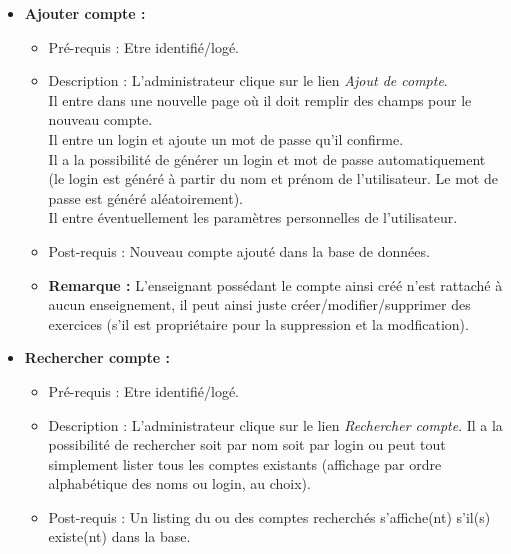 \begin{itemize}
\item  {\bf Ajouter compte :}
	\begin{itemize}
	\item Pr{\'e}-requis : Etre identifi{\'e}/log{\'e}. 
	\item Description : L'administrateur clique sur le lien {\it Ajout de compte}.\\
	Il entre dans une nouvelle page o{\`u} il doit
	remplir des champs pour le nouveau compte.\\
	Il entre un login et ajoute un mot de passe qu'il confirme.\\
	Il a la possibilit{\'e} de g{\'e}n{\'e}rer un login et
	mot de passe automatiquement (le login est g{\'e}n{\'e}r{\'e} {\`a} partir du
	nom et pr{\'e}nom de l'utilisateur. Le mot de passe est g{\'e}n{\'e}r{\'e}
	al{\'e}atoirement).\\
	Il entre {\'e}ventuellement les param{\`e}tres
	personnelles de l'utilisateur.
	\item Post-requis : Nouveau compte ajout{\'e} dans
	la base de donn{\'e}es.
	\item {\bf Remarque :} L'enseignant poss{\'e}dant
	le compte ainsi cr{\'e}{\'e} n'est rattach{\'e} {\`a} aucun
	enseignement, il peut ainsi juste
	cr{\'e}er/modifier/supprimer des exercices (s'il
	est propri{\'e}taire pour la suppression et la modfication).  
	\end{itemize}

\item  {\bf Rechercher compte :}
	\begin{itemize}
	\item Pr{\'e}-requis : Etre identifi{\'e}/log{\'e}. 
	\item Description : L'administrateur clique
	sur le lien {\it Rechercher compte}. Il a la
	possibilit{\'e} de rechercher soit par nom soit
	par login ou peut tout simplement lister tous
	les comptes existants (affichage par ordre
	alphab{\'e}tique des noms ou login, au choix).
	\item Post-requis : Un listing du ou des
	comptes recherch{\'e}s s'affiche(nt) s'il(s)
	existe(nt) dans la base.
	\end{itemize}


\end{itemize}

